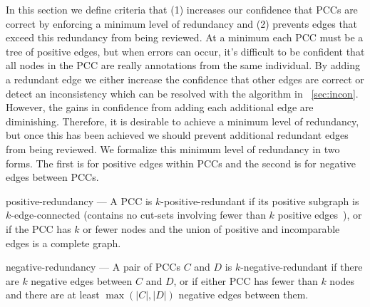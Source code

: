 In this section we define criteria that
(1) increases our confidence that PCCs are correct by enforcing a minimum level of redundancy and
(2) prevents edges that exceed this redundancy from being reviewed.
At a minimum each PCC must be a tree of positive edges, but when errors can occur, it's difficult to be confident
  that all nodes in the PCC are really annotations from the same individual.
By adding a redundant edge we either increase the confidence that other edges are correct or detect an
  inconsistency which can be resolved with the algorithm in ~\cref{sec:incon}.
However, the gains in confidence from adding each additional edge are diminishing.
Therefore, it is desirable to achieve a minimum level of redundancy, but once this has been achieved we should
  prevent additional redundant edges from being reviewed.
We formalize this minimum level of redundancy in two forms.
The first is for positive edges within PCCs and the second is for negative edges between PCCs.
\begin{enumln}

    \item positive-redundancy --- %
        A PCC is $k$-positive-redundant if its positive subgraph is $k$-edge-connected (contains no cut-sets
          involving fewer than $k$ positive edges~\cite{eswaran_augmentation_1976}), or if the PCC has $k$ or fewer
          nodes and the union of positive and incomparable edges is a complete graph.

    \item negative-redundancy --- %
        A pair of PCCs $C$ and $D$ is $k$-negative-redundant if there are $k$ negative edges between $C$ and $D$,
        or if either PCC has fewer than $k$ nodes and there are at least $\mathop{max}(|C|, |D|)$ negative edges
        between them.
        

\end{enumln}
\kredun{}

